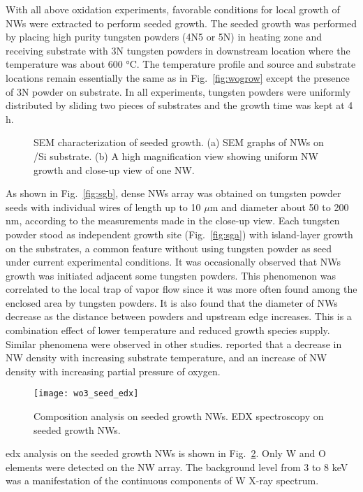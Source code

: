 With all above oxidation experiments, favorable conditions for local growth of NWs were extracted to perform seeded growth. The seeded growth was performed by placing high purity tungsten powders (4N5 or 5N) in heating zone and receiving substrate with 3N tungsten powders in downstream location where the temperature was about 600 \si{\degreeCelsius}. The temperature profile and source and substrate locations remain essentially the same as in Fig.~\ref{fig:wogrow} except the presence of 3N powder on substrate. In all experiments, tungsten powders were uniformly distributed by sliding two pieces of substrates and the growth time was kept at 4 h.
\begin{figure}[htb]
\centering
{}\hspace{0.04\textwidth}
\caption[SEM characterization of  seeded growth]{SEM characterization of  seeded growth. (a) SEM graphs of  NWs on /Si substrate. (b) A high magnification view showing uniform NW growth and close-up view of one NW.}
\label{fig:woseedsem}
\end{figure}
As shown in Fig.~\ref{fig:sgb}, dense NWs array was obtained on tungsten powder seeds with individual wires of length up to 10 $\mu$m and diameter about 50 to 200 nm, according to the measurements made in the close-up view. Each tungsten powder stood as independent growth site (Fig.~\ref{fig:sga}) with island-layer growth on the substrates, a common feature without using tungsten powder as seed under current experimental conditions. It was occasionally observed that NWs growth was initiated adjacent some tungsten powders. This phenomenon was correlated to the local trap of vapor flow since it was more often found among the enclosed area by tungsten powders. It is also found that the diameter of NWs decrease as the distance between powders and upstream edge increases. This is a combination effect of lower temperature and reduced  growth species supply. Similar phenomena were observed in other studies. \citeauthor{Thangala2007} reported that a decrease in NW density with increasing substrate temperature, and an increase of NW density with increasing partial pressure of oxygen.\cite{Thangala2007}

\begin{figure}[htb]
\centering
\texttt{[image: wo3\_seed\_edx]}
\caption[Composition analysis on seeded growth  NWs]{Composition analysis on seeded growth  NWs. EDX spectroscopy on seeded growth  NWs.}
\label{fig:woedx}
\end{figure}
\gls{edx} analysis on the seeded growth  NWs is shown in Fig.~\ref{fig:woedx}. Only W and O elements were detected on the NW array. The background level from 3 to 8 keV was a manifestation of the continuous components of W X-ray spectrum. 

